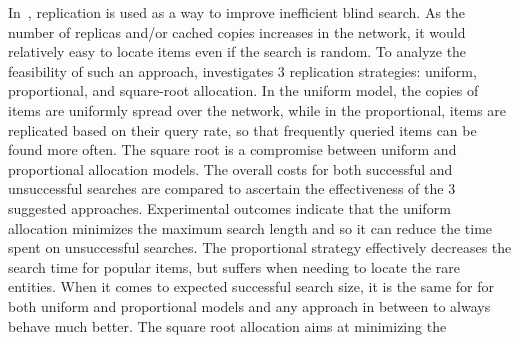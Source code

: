 In~\cite{CS2002}, replication is used as a way 
to improve inefficient blind search.
As the number of replicas and/or cached copies increases in the network,
it would relatively easy to locate items even if the search is random.
To analyze the feasibility of
such an approach, \cite{CS2002} investigates $3$ replication
strategies: uniform, proportional, and square-root allocation. In the
uniform model, the copies of items are uniformly spread over the network,
while in the proportional, items are replicated based on their query
rate, so that frequently queried items can be found more often. 
The square root is a compromise between uniform 
and proportional allocation models.
The overall costs for both successful and unsuccessful
searches are compared to ascertain the effectiveness of the $3$ suggested 
approaches.
Experimental outcomes indicate that the uniform allocation 
minimizes the maximum search length and so it can 
reduce the time spent on unsuccessful searches.
The proportional strategy effectively decreases the search time 
for popular items, but suffers when needing to locate the rare entities.
When it comes to expected successful search size, it is the same for 
for both uniform and proportional models and any approach in between 
to always behave much better.
The square root allocation  aims at minimizing the 
